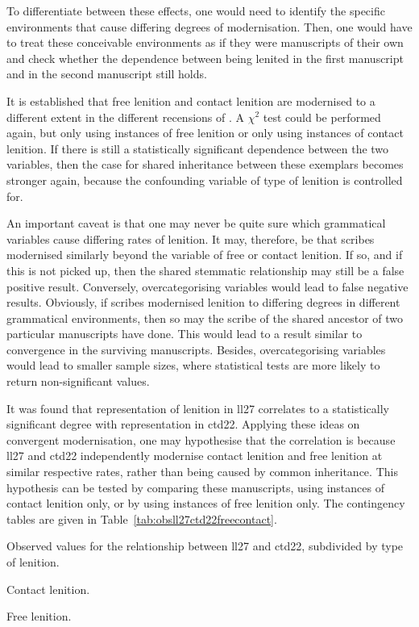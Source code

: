To differentiate between these effects, one would need to identify the specific environments that cause differing degrees of modernisation. Then, one would have to treat these conceivable environments as if they were manuscripts of their own and check whether the dependence between being lenited in the first manuscript and in the second manuscript still holds.

It is established that free lenition and contact lenition are modernised to a different extent in the different recensions of . A \(\chi^2\) test could be performed again, but only using instances of free lenition or only using instances of contact lenition. If there is still a statistically significant dependence between the two variables, then the case for shared inheritance between these exemplars becomes stronger again, because the confounding variable of type of lenition is controlled for.

An important caveat is that one may never be quite sure which grammatical variables cause differing rates of lenition. It may, therefore, be that scribes modernised similarly beyond the variable of free or contact lenition. If so, and if this is not picked up, then the shared stemmatic relationship may still be a false positive result.
Conversely, overcategorising variables would lead to false negative results. Obviously, if scribes modernised lenition to differing degrees in different grammatical environments, then so may the scribe of the shared ancestor of two particular manuscripts have done. This would lead to a result similar to convergence in the surviving manuscripts. Besides, overcategorising variables would lead to smaller sample sizes, where statistical tests are more likely to return non-significant values.

It was found that representation of lenition in \gls{ll27} correlates to a statistically significant degree with representation in \gls{ctd22}. Applying these ideas on convergent modernisation, one may  hypothesise that the correlation is because \gls{ll27} and \gls{ctd22} independently modernise contact lenition and free lenition at similar respective rates, rather than being caused by common inheritance. This hypothesis can be tested by comparing these manuscripts, using instances of contact lenition only, or by using instances of free lenition only. The contingency tables are given in Table~\ref{tab:obsll27ctd22freecontact}.

\begin{table}[h]
  \caption{Observed values for the relationship between  \acrshort{ll27} and \acrshort{ctd22}, subdivided by type of lenition.}
  \label{tab:obsll27ctd22freecontact}
  \begin{subtable}[b]{0.5\linewidth}
    \centering
    \caption{Contact lenition.}
    \label{tab:contactlentab}
    
  \end{subtable}%
  \begin{subtable}[b]{0.5\linewidth}
    \centering
    \caption{Free lenition.}
    \label{tab:obsll27ctd22free}
    
  \end{subtable}
\end{table}

